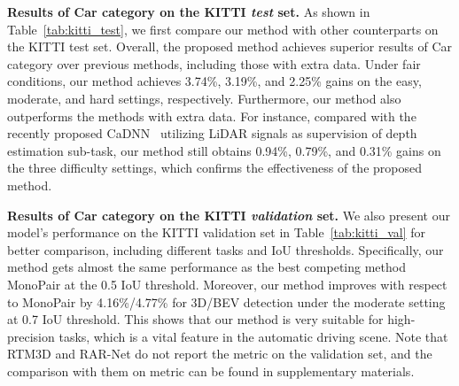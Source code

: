 \documentclass[10pt,twocolumn,letterpaper]{article}
\begin{document}
\begin{table}[!t]
    \centering
    \fontsize{7}{10}\selectfont
    \caption{{\bf Ablation studies} on the KITTI \emph{validation} set for the Car category.}
    \label{tab:ablation}
    \renewcommand\tabcolsep{3.0pt}
\end{table}

\noindent
{\bf Results of Car category on the KITTI \emph{test} set.}
As shown in Table~\ref{tab:kitti_test}, we first compare our method with other counterparts on the KITTI test set.
Overall,  the proposed method achieves superior results of Car category over previous methods, including those with extra data.
Under fair conditions, our method achieves 3.74\%, 3.19\%, and 2.25\% gains on the easy, moderate, and hard settings, respectively.
Furthermore, our method also outperforms the methods with extra data.
For instance, compared with the recently proposed CaDNN~\cite{reading2021categorical} utilizing LiDAR signals as supervision of depth estimation sub-task, our method still obtains 0.94\%, 0.79\%, and 0.31\% gains on the three difficulty settings, which confirms the effectiveness of the proposed method.


\noindent
{\bf Results of Car category on the KITTI \emph{validation} set.}
We also present our model’s performance on the KITTI validation set in Table~\ref{tab:kitti_val} for better comparison, including different tasks and IoU thresholds.
Specifically, our method gets almost the same performance as the best competing method MonoPair at the 0.5 IoU threshold. 
Moreover, our method improves with respect to MonoPair by 4.16\%/4.77\% for 3D/BEV detection under the moderate setting at 0.7 IoU threshold.
This shows that our method is very suitable for high-precision tasks, which is a vital feature in the automatic driving scene.
Note that RTM3D and RAR-Net do not report the  metric on the validation set, and the comparison with them on  metric can be found in supplementary materials.
\end{document}
